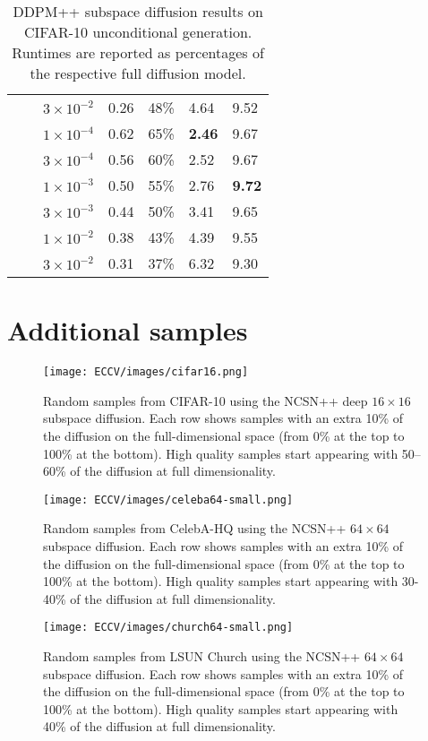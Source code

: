 \documentclass{article}
\begin{document}
\begin{table}[h!]
\begin{tabularx}{\textwidth}{YYYYYYY}
    & & $3\times 10^{-2}$ &	0.26 & 48\%	&	4.64	&	9.52 \\  \cmidrule(lr){2-7}
    &    
      & $1\times 10^{-4}$ &	0.62 & 65\%	&	\textbf{2.46}	&	9.67 \\
    & & $3\times 10^{-4}$ &	0.56 & 60\%	&	2.52	&	9.67 \\
    & & $1\times 10^{-3}$ &	0.50 & 55\%	&	2.76	&	\textbf{9.72} \\
    & & $3\times 10^{-3}$ &	0.44 & 50\%	&	3.41	&	9.65 \\
    & & $1\times 10^{-2}$ &	0.38 & 43\%	&	4.39	&	9.55 \\
    & & $3\times 10^{-2}$ &	0.31 & 37\%	&	6.32	&	9.30 \\  \bottomrule
    \end{tabularx}
    \caption{DDPM++ subspace diffusion results on CIFAR-10 unconditional generation. Runtimes are reported as percentages of the respective full diffusion model.}
    \label{tab:cifar_ddpm}
\end{table}

\clearpage
\section{Additional samples} \label{appendix:samples}

\begin{figure}[h!]
    \centering
    \texttt{[image: ECCV/images/cifar16.png]}
    \caption{Random samples from CIFAR-10 using the NCSN++ deep $16\times 16$ subspace diffusion. Each row shows samples with an extra 10\% of the diffusion on the  full-dimensional space (from 0\% at the top to 100\% at the bottom). High quality samples start appearing with 50--60\% of the diffusion at full dimensionality.  }
    \label{fig:cifar16}
\end{figure}

\begin{figure}
    \centering
    \texttt{[image: ECCV/images/celeba64-small.png]}
    \caption{Random samples from CelebA-HQ using the NCSN++ $64\times 64$ subspace diffusion. Each row shows samples with an extra 10\% of the diffusion on the  full-dimensional space (from 0\% at the top to 100\% at the bottom). High quality samples start appearing with 30-40\% of the diffusion at full dimensionality.  }
    \label{fig:celeba64}
\end{figure}

\begin{figure}
    \centering
    \texttt{[image: ECCV/images/church64-small.png]}
    \caption{Random samples from LSUN Church using the NCSN++ $64\times 64$ subspace diffusion. Each row shows samples with an extra 10\% of the diffusion on the  full-dimensional space (from 0\% at the top to 100\% at the bottom). High quality samples start appearing with 40\% of the diffusion at full dimensionality.}
    \label{fig:church64}
\end{figure}
\end{document}
